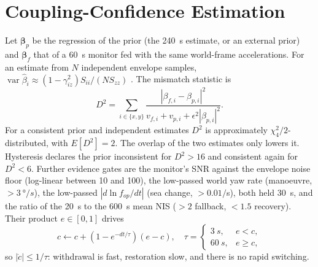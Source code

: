 \documentclass[conference]{IEEEtran}
\DeclareRobustCommand{\vct}[1]{\bm{#1}}
\theoremstyle{bodysmall}
\begin{document}
\section{Coupling-Confidence Estimation}
\label{sec:conf}
Let $\vct\beta_p$ be the regression of the prior (the \SI{240}{s} estimate, or
an external prior) and $\vct\beta_f$ that of a \SI{60}{s} monitor fed with the
same world-frame accelerations. For an estimate from $N$ independent
envelope samples, $\operatorname{var}\hat\beta_i\approx(1-\gamma_{iz}^2)S_{ii}/(NS_{zz})$
\cite{bendat10}. The mismatch statistic is
\begin{equation}
D^2=\sum_{i\in\{x,y\}}\frac{|\beta_{f,i}-\beta_{p,i}|^2}{v_{f,i}+v_{p,i}+\epsilon^2|\beta_{p,i}|^2}.
\end{equation}
For a consistent prior and independent estimates $D^2$ is approximately
$\chi^2_4/2$-distributed, with $E[D^2]=2$. The overlap of the two estimates
only lowers it. Hysteresis declares the prior inconsistent for $D^2>16$ and
consistent again for $D^2<6$. Further evidence gates are the monitor's SNR
against the envelope noise floor (log-linear between 10 and 100), the
low-passed world yaw rate (manoeuvre, $>\SI{3}{\degree/s}$), the low-passed
$|d\ln f_{op}/dt|$ (sea change, $>0.01/$s), both held \SI{30}{s}, and the
ratio of the \SI{20}{s} to the \SI{600}{s} mean NIS ($>2$ fallback, $<1.5$
recovery). Their product $e\in[0,1]$ drives
\begin{equation}
c\leftarrow c+(1-e^{-dt/\tau})(e-c),\quad\tau=\begin{cases}\SI{3}{s},&e<c,\\\SI{60}{s},&e\ge c,\end{cases}
\end{equation}
so $|\dot c|\le1/\tau$: withdrawal is fast, restoration slow, and there is no
rapid switching.
\end{document}
